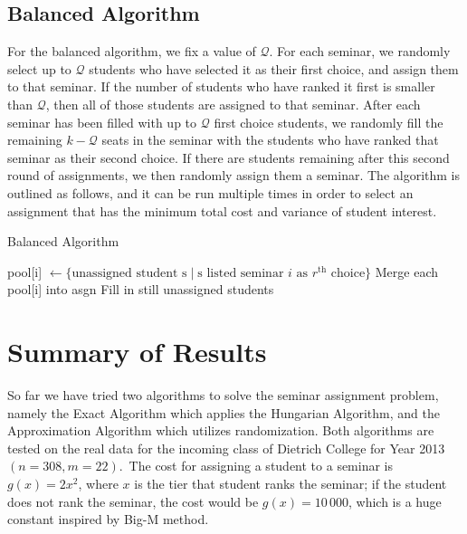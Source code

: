 \documentclass{article} %
\begin{document}
\subsection{Balanced Algorithm}
    \par For the balanced algorithm, we fix a value of $\mathcal{Q}$. For each seminar, we randomly select up to $\mathcal{Q}$ students who have selected it as their first choice, and assign them to that seminar. If the number of students who have ranked it first is smaller than $\mathcal{Q}$, then all of those students are assigned to that seminar. After each seminar has been filled with up to $\mathcal{Q}$ first choice students, we randomly fill the remaining $k - \mathcal{Q}$ seats in the seminar with the students who have ranked that seminar as their second choice. If there are students remaining after this second round of assignments, we then randomly assign them a seminar. The algorithm is outlined as follows, and it can be run multiple times in order to select an assignment that has the minimum total cost and variance of student interest.
    \begin{algorithm}
        \caption{Balanced Algorithm}
        \begin{algorithmic}
                    \State pool[i] $\gets \{\text{unassigned student s} \mid \text{s listed seminar $i$ as $r^\text{th}$ choice}\}$
                \EndFor
                \State Merge each pool[i] into asgn
            \EndWhile
            \State Fill in still unassigned students
        \end{algorithmic}
    \end{algorithm}

%
%
\section{Summary of Results}
    \par\qquad So far we have tried two algorithms to solve the seminar assignment problem, namely the Exact Algorithm which applies the Hungarian Algorithm, and the Approximation Algorithm which utilizes randomization. Both algorithms are tested on the real data for the incoming class of Dietrich College for Year 2013 $(n=308, m=22)$. The cost for assigning a student to a seminar is $g(x)=2x^2$, where $x$ is the tier that student ranks the seminar; if the student does not rank the seminar, the cost would be $g(x)=10\,000$, which is a huge constant inspired by Big-M method.
\end{document}

